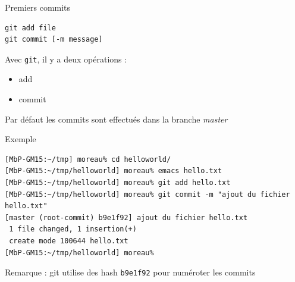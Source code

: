 \begin{frame}[fragile]{%
\protect\hypertarget{premiers-commits}{%
Premiers commits}}

\begin{lstlisting}
git add file
git commit [-m message]
\end{lstlisting}

Avec \texttt{git}, il y a deux opérations :

\begin{itemize}
\tightlist
\item
  add
\item
  commit
\end{itemize}

Par défaut les commits sont effectués dans la branche \emph{master}

\end{frame}

\begin{frame}[fragile]{%
\protect\hypertarget{exemple}{%
Exemple}}

\begin{lstlisting}
[MbP-GM15:~/tmp] moreau% cd helloworld/
[MbP-GM15:~/tmp/helloworld] moreau% emacs hello.txt
[MbP-GM15:~/tmp/helloworld] moreau% git add hello.txt
[MbP-GM15:~/tmp/helloworld] moreau% git commit -m "ajout du fichier hello.txt"
[master (root-commit) b9e1f92] ajout du fichier hello.txt
 1 file changed, 1 insertion(+)
 create mode 100644 hello.txt
[MbP-GM15:~/tmp/helloworld] moreau%
\end{lstlisting}

Remarque : git utilise des hash \texttt{b9e1f92} pour numéroter les
commits

\end{frame}

